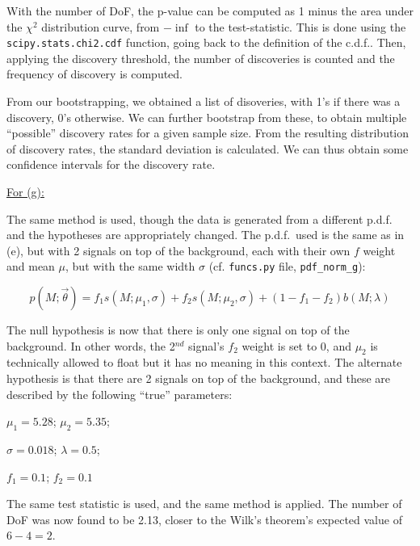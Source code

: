 \documentclass[12pt]{report} %
\begin{document}
With the number of DoF, the p-value can be computed as 1 minus the area under the $\chi^{2}$ distribution curve, from $-\inf$ to the test-statistic. This is done using the \texttt{scipy.stats.chi2.cdf} function, going back to the definition of the c.d.f.\cite[pp. 20-23]{Wass}\cite{scipy-stats}. Then, applying the discovery threshold, the number of discoveries is counted and the frequency of discovery is computed.  

From our bootstrapping, we obtained a list of disoveries, with 1's if there was a discovery, 0's otherwise. We can further bootstrap from these, to obtain multiple ``possible'' discovery rates for a given sample size. From the resulting distribution of discovery rates, the standard deviation is calculated. We can thus obtain some confidence intervals for the discovery rate.

\vspace*{1\baselineskip}
\underline{For (g):} 

\vspace*{1\baselineskip}
The same method is used, though the data is generated from a different p.d.f. and the hypotheses are appropriately changed. The p.d.f.\ used is the same as in (e), but with 2 signals on top of the background, each with their own $f$ weight and mean $\mu$, but with the same width $\sigma$ (cf. \texttt{funcs.py} file, \texttt{pdf\_norm\_g}):  

\begin{equation}
    p(M;\vec{\theta}) = f_{1}s(M;\mu_{1},\sigma) + f_{2}s(M;\mu_{2},\sigma) + (1 - f_{1} - f_{2})b(M;\lambda)
\end{equation}


The null hypothesis is now that there is only one signal on top of the background. In other words, the 2$^{nd}$ signal's $f_{2}$ weight is set to 0, and $\mu_{2}$ is technically allowed to float but it has no meaning in this context. The alternate hypothesis is that there are 2 signals on top of the background, and these are described by the following ``true'' parameters:

\begin{center}
    $\mu_{1} = 5.28$;  
    $\mu_{2} = 5.35$;  

    $\sigma = 0.018$;
    $\lambda = 0.5$;  

    $f_{1} = 0.1$;
    $f_{2} = 0.1$
\end{center}

The same test statistic is used, and the same method is applied. The number of DoF was now found to be 2.13, closer to the Wilk's theorem's expected value of $6 - 4 = 2$. 
\end{document}
